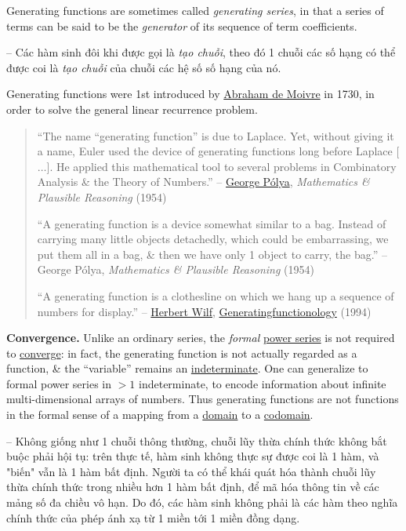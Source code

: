 \documentclass[oneside]{book}
\begin{document}
Generating functions are sometimes called {\it generating series}, in that a series of terms can be said to be the {\it generator} of its sequence of term coefficients.

-- Các hàm sinh đôi khi được gọi là {\it tạo chuỗi}, theo đó 1 chuỗi các số hạng có thể được coi là {\it tạo chuỗi} của chuỗi các hệ số số hạng của nó.

 Generating functions were 1st introduced by \href{https://en.wikipedia.org/wiki/Abraham_de_Moivre}{\sc Abraham de Moivre} in 1730, in order to solve the general linear recurrence problem.
\begin{quotation}
	``The name ``generating function'' is due to {\sc Laplace}. Yet, without giving it a name, {\sc Euler} used the device of generating functions long before {\sc Laplace} [$\ldots$]. He applied this mathematical tool to several problems in Combinatory Analysis \& the Theory of Numbers.'' -- \href{https://en.wikipedia.org/wiki/George_P%C3%B3lya}{\sc George P\'olya}, {\it Mathematics \& Plausible Reasoning} (1954)
	
	``A generating function is a device somewhat similar to a bag. Instead of carrying many little objects detachedly, which could be embarrassing, we put them all in a bag, \& then we have only 1 object to carry, the bag.'' -- {\sc George P\'olya}, {\it Mathematics \& Plausible Reasoning} (1954)
	
	``A generating function is a clothesline on which we hang up a sequence of numbers for display.'' -- \href{https://en.wikipedia.org/wiki/Herbert_Wilf}{\sc Herbert Wilf}, \href{http://www.math.upenn.edu/~wilf/DownldGF.html}{Generatingfunctionology} (1994)
\end{quotation}
{\bf Convergence.} Unlike an ordinary series, the {\it formal} \href{https://en.wikipedia.org/wiki/Power_series}{power series} is not required to \href{https://en.wikipedia.org/wiki/Convergent_series}{converge}: in fact, the generating function is not actually regarded as a function, \& the ``variable'' remains an \href{https://en.wikipedia.org/wiki/Indeterminate_(variable)}{indeterminate}. One can generalize to formal power series in $> 1$ indeterminate, to encode information about infinite multi-dimensional arrays of numbers. Thus generating functions are not functions in the formal sense of a mapping from a \href{https://en.wikipedia.org/wiki/Domain_of_a_function}{domain} to a \href{https://en.wikipedia.org/wiki/Codomain}{codomain}.

-- Không giống như 1 chuỗi thông thường, chuỗi lũy thừa chính thức không bắt buộc phải hội tụ: trên thực tế, hàm sinh không thực sự được coi là 1 hàm, và "biến" vẫn là 1 hàm bất định. Người ta có thể khái quát hóa thành chuỗi lũy thừa chính thức trong nhiều hơn 1 hàm bất định, để mã hóa thông tin về các mảng số đa chiều vô hạn. Do đó, các hàm sinh không phải là các hàm theo nghĩa chính thức của phép ánh xạ từ 1 miền tới 1 miền đồng dạng.
\end{document}
